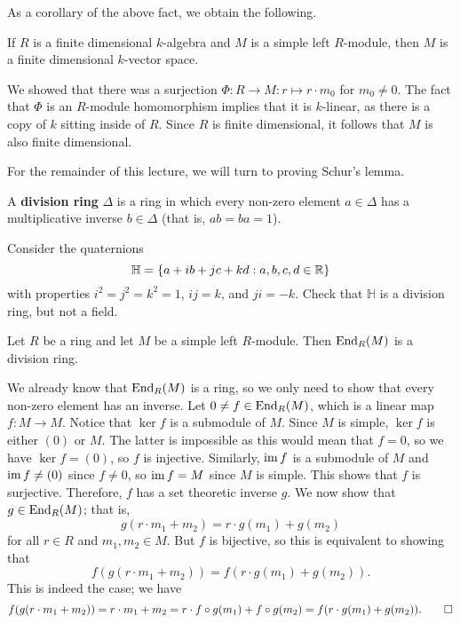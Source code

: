 As a corollary of the above fact, we obtain the following. 

\begin{cor}{}
If $R$ is a finite dimensional $k$-algebra and $M$ is a simple left $R$-module, then $M$ is a 
finite dimensional $k$-vector space.
\end{cor}

\begin{pf}
We showed that there was a surjection $\Phi : R \to M : r \mapsto r \cdot m_0$
for $m_0 \neq 0$. The fact that $\Phi$ is an $R$-module homomorphism implies that it is $k$-linear, 
as there is a copy of $k$ sitting inside of $R$. Since $R$ is finite dimensional, it follows that 
$M$ is also finite dimensional.
\end{pf}

For the remainder of this lecture, we will turn to proving Schur's lemma. 

\begin{defn}{}
A {\bf division ring} $\Delta$ is a ring in which every non-zero element $a \in \Delta$ 
has a multiplicative inverse $b \in \Delta$ (that is, $ab = ba = 1$).
\end{defn}

\begin{exmp}{}
Consider the quaternions 
\[ \mathbb{H} = \{a + ib + jc + kd : a, b, c, d \in \mathbb{R}\} \]
with properties 
$i^2 = j^2 = k^2 = 1$, $ij = k$, and $ji = -k$. Check that $\mathbb{H}$ is a division ring, 
but not a field.
\end{exmp}

\begin{theo}{}
Let $R$ be a ring and let $M$ be a simple left $R$-module. Then $\operatorname{End}_R(M)$ is a division ring.
\end{theo}
\begin{pf}
We already know that $\operatorname{End}_R(M)$ is a ring, so we only need to show that every non-zero element 
has an inverse. Let $0 \neq f \in \operatorname{End}_R(M)$, which is a linear map $f : M \to M$. Notice that 
$\ker f$ is a submodule of $M$. Since $M$ is simple, $\ker f$ is either $(0)$ or $M$. The latter 
is impossible as this would mean that $f = 0$, so we have $\ker f = (0)$, so $f$ is injective. 
Similarly, $\operatorname{im} f$ is a submodule of $M$ and $\operatorname{im} f \neq (0)$ since $f \neq 0$, so 
$\operatorname{im} f = M$ since $M$ is simple. This shows that $f$ is surjective. Therefore, $f$ has a 
set theoretic inverse $g$. We now show that $g \in \operatorname{End}_R(M)$; that is, 
\[ g(r \cdot m_1 + m_2) = r \cdot g(m_1) + g(m_2) \]
for all $r \in R$ and $m_1, m_2 \in M$. But $f$ is bijective, so this is equivalent to showing that 
\[ f(g(r \cdot m_1 + m_2)) = f(r \cdot g(m_1) + g(m_2)). \]
This is indeed the case; we have 
\[ f(g(r \cdot m_1 + m_2)) = r \cdot m_1 + m_2 = r \cdot f \circ g(m_1) + f \circ g(m_2) = f(r \cdot g(m_1) + g(m_2)). \qedhere \]
\end{pf}

